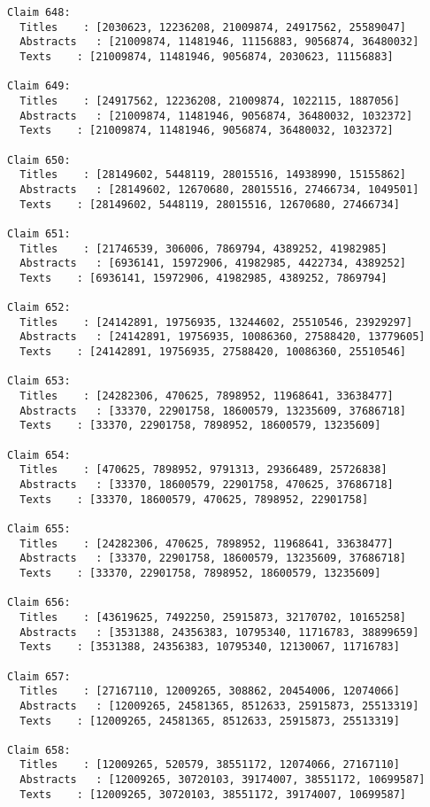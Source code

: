 \documentclass[11pt]{article}
\begin{document}
\begin{Verbatim}[commandchars=\\\{\}]
Claim 648:
  Titles    : [2030623, 12236208, 21009874, 24917562, 25589047]
  Abstracts   : [21009874, 11481946, 11156883, 9056874, 36480032]
  Texts    : [21009874, 11481946, 9056874, 2030623, 11156883]

Claim 649:
  Titles    : [24917562, 12236208, 21009874, 1022115, 1887056]
  Abstracts   : [21009874, 11481946, 9056874, 36480032, 1032372]
  Texts    : [21009874, 11481946, 9056874, 36480032, 1032372]

Claim 650:
  Titles    : [28149602, 5448119, 28015516, 14938990, 15155862]
  Abstracts   : [28149602, 12670680, 28015516, 27466734, 1049501]
  Texts    : [28149602, 5448119, 28015516, 12670680, 27466734]

Claim 651:
  Titles    : [21746539, 306006, 7869794, 4389252, 41982985]
  Abstracts   : [6936141, 15972906, 41982985, 4422734, 4389252]
  Texts    : [6936141, 15972906, 41982985, 4389252, 7869794]

Claim 652:
  Titles    : [24142891, 19756935, 13244602, 25510546, 23929297]
  Abstracts   : [24142891, 19756935, 10086360, 27588420, 13779605]
  Texts    : [24142891, 19756935, 27588420, 10086360, 25510546]

Claim 653:
  Titles    : [24282306, 470625, 7898952, 11968641, 33638477]
  Abstracts   : [33370, 22901758, 18600579, 13235609, 37686718]
  Texts    : [33370, 22901758, 7898952, 18600579, 13235609]

Claim 654:
  Titles    : [470625, 7898952, 9791313, 29366489, 25726838]
  Abstracts   : [33370, 18600579, 22901758, 470625, 37686718]
  Texts    : [33370, 18600579, 470625, 7898952, 22901758]

Claim 655:
  Titles    : [24282306, 470625, 7898952, 11968641, 33638477]
  Abstracts   : [33370, 22901758, 18600579, 13235609, 37686718]
  Texts    : [33370, 22901758, 7898952, 18600579, 13235609]

Claim 656:
  Titles    : [43619625, 7492250, 25915873, 32170702, 10165258]
  Abstracts   : [3531388, 24356383, 10795340, 11716783, 38899659]
  Texts    : [3531388, 24356383, 10795340, 12130067, 11716783]

Claim 657:
  Titles    : [27167110, 12009265, 308862, 20454006, 12074066]
  Abstracts   : [12009265, 24581365, 8512633, 25915873, 25513319]
  Texts    : [12009265, 24581365, 8512633, 25915873, 25513319]

Claim 658:
  Titles    : [12009265, 520579, 38551172, 12074066, 27167110]
  Abstracts   : [12009265, 30720103, 39174007, 38551172, 10699587]
  Texts    : [12009265, 30720103, 38551172, 39174007, 10699587]


\end{Verbatim}
\end{document}
